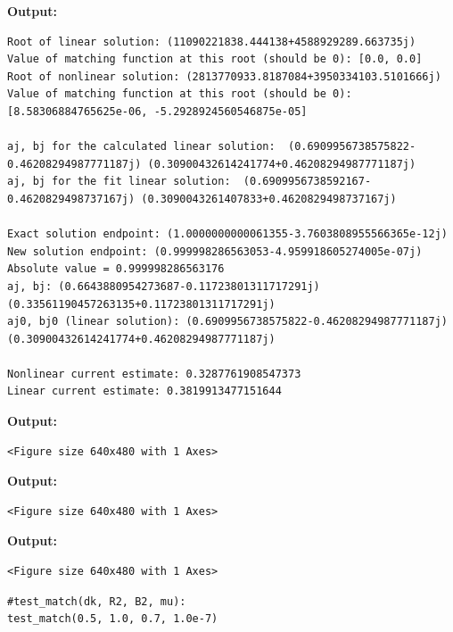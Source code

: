 \documentclass{article}
\begin{document}
\textbf{Output:}\begin{verbatim}
Root of linear solution: (11090221838.444138+4588929289.663735j)
Value of matching function at this root (should be 0): [0.0, 0.0]
Root of nonlinear solution: (2813770933.8187084+3950334103.5101666j)
Value of matching function at this root (should be 0): [8.58306884765625e-06, -5.2928924560546875e-05]

aj, bj for the calculated linear solution:  (0.6909956738575822-0.46208294987771187j) (0.30900432614241774+0.46208294987771187j)
aj, bj for the fit linear solution:  (0.6909956738592167-0.4620829498737167j) (0.3090043261407833+0.4620829498737167j)

Exact solution endpoint: (1.0000000000061355-3.7603808955566365e-12j)
New solution endpoint: (0.999998286563053-4.959918605274005e-07j) Absolute value = 0.999998286563176
aj, bj: (0.6643880954273687-0.11723801311717291j) (0.33561190457263135+0.11723801311717291j)
aj0, bj0 (linear solution): (0.6909956738575822-0.46208294987771187j) (0.30900432614241774+0.46208294987771187j)

Nonlinear current estimate: 0.3287761908547373
Linear current estimate: 0.3819913477151644

\end{verbatim}

\textbf{Output:}\begin{verbatim}
<Figure size 640x480 with 1 Axes>
\end{verbatim}

\textbf{Output:}\begin{verbatim}
<Figure size 640x480 with 1 Axes>
\end{verbatim}

\textbf{Output:}\begin{verbatim}
<Figure size 640x480 with 1 Axes>
\end{verbatim}

\begin{lstlisting}
#test_match(dk, R2, B2, mu):
test_match(0.5, 1.0, 0.7, 1.0e-7)\end{lstlisting}
\end{document}
